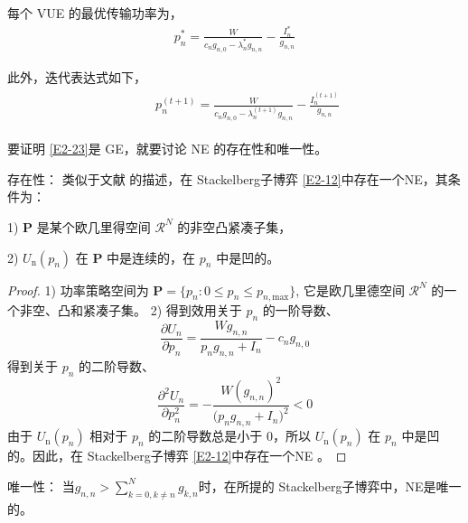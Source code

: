 每个 VUE 的最优传输功率为，
\begin{equation}\label{E2-23}
\begin{array}{*{21}{ll}}
 p_n^{*}=\frac{W}{c_n g_{n,0}-\lambda_n^{*}g_{n,n}}-\frac{I_n^{*}}{g_{n,n}}
\end{array}
\end{equation}

此外，迭代表达式如下，
\begin{eqnarray}\label{E2-24}
\begin{array}{lll}
\qquad p_n^{(t+1)}=\frac{W}{c_n g_{n,0}-\lambda_n^{(t+1)}g_{n,n}}-\frac{I_n^{(t+1)}}{g_{n,n}}
\end{array}
\end{eqnarray}

要证明 \eqref{E2-23}是 GE，就要讨论 NE 的存在性和唯一性。

存在性： 类似于文献 \cite{GT} 的描述，在 Stackelberg子博弈 \eqref{E2-12}中存在一个NE，其条件为：

1) $\mathbf{P}$ 是某个欧几里得空间 $\mathcal{R}^N$ 的非空凸紧凑子集，

2) $U_{\textrm{n}}(p_n)$ 在 $\mathbf{P}$ 中是连续的，在 $p_n$ 中是凹的。

\begin{proof}

1) 功率策略空间为 $\mathbf{P}=\{p_n:0\leq p_n \leq p_{n,\textrm{max}}\}$, 它是欧几里德空间 $\mathcal{R}^N$ 的一个非空、凸和紧凑子集。
2) 得到效用关于 $p_n$ 的一阶导数、
\begin{equation}\label{25}
\frac{\partial U_{n}}{\partial p_n}=\frac{Wg_{n,n}}{p_n g_{n,n}+I_n}-c_ng_{n,0}
\end{equation}
得到关于 $p_n$ 的二阶导数、
\begin{equation}\label{26}
\frac{\partial^2 U_{n}}{\partial p_n^2}=-\frac{W(g_{n,n})^2}{\big(p_n g_{n,n} +I_n\big)^2}<0
\end{equation}
由于 $U_{\textrm{n}}(p_n)$ 相对于 $p_n$ 的二阶导数总是小于 0，所以 $U_{\textrm{n}}(p_n)$ 在 $p_n$ 中是凹的。因此，在 Stackelberg子博弈 \ref{E2-12}中存在一个NE 。
\end{proof}\par

唯一性： 当$g_{n,n}$$>$$\sum\limits_{k=0,k\neq n}^N g_{k,n}$时，在所提的 Stackelberg子博弈中，NE是唯一的。

